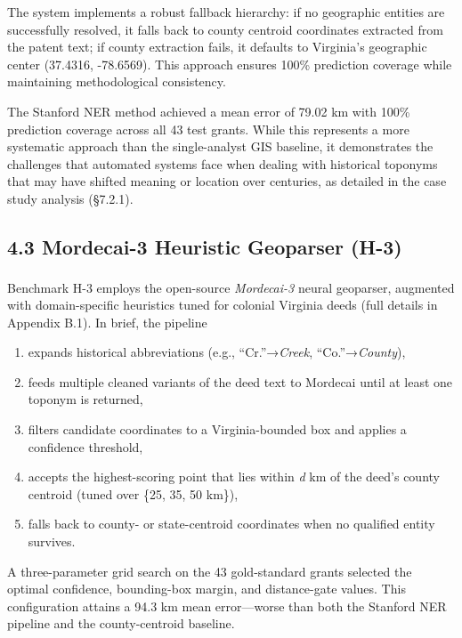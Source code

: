\documentclass[
  10pt]{article}
\providecommand{\tightlist}{%
  \setlength{\itemsep}{0pt}\setlength{\parskip}{0pt}}
\begin{document}
The system implements a robust fallback hierarchy: if no geographic
entities are successfully resolved, it falls back to county centroid
coordinates extracted from the patent text; if county extraction fails,
it defaults to Virginia's geographic center (37.4316, -78.6569). This
approach ensures 100\% prediction coverage while maintaining
methodological consistency.

The Stanford NER method achieved a mean error of 79.02 km with 100\%
prediction coverage across all 43 test grants. While this represents a
more systematic approach than the single-analyst GIS baseline, it
demonstrates the challenges that automated systems face when dealing
with historical toponyms that may have shifted meaning or location over
centuries, as detailed in the case study analysis (§7.2.1).

\subsection{4.3 Mordecai-3 Heuristic Geoparser
(H-3)}\label{mordecai-3-heuristic-geoparser-h-3}

Benchmark H-3 employs the open-source \emph{Mordecai-3} neural
geoparser\textsuperscript{},
augmented with domain-specific heuristics tuned for colonial Virginia
deeds (full details in Appendix B.1). In brief, the pipeline

\begin{enumerate}
\def\labelenumi{\arabic{enumi}.}
\tightlist
\item
  expands historical abbreviations (e.g., ``Cr.''→\emph{Creek},
  ``Co.''→\emph{County}),
\item
  feeds multiple cleaned variants of the deed text to Mordecai until at
  least one toponym is returned,
\item
  filters candidate coordinates to a Virginia-bounded box and applies a
  confidence threshold,
\item
  accepts the highest-scoring point that lies within \emph{d} km of the
  deed's county centroid (tuned over \{25, 35, 50 km\}),
\item
  falls back to county- or state-centroid coordinates when no qualified
  entity survives.
\end{enumerate}

A three-parameter grid search on the 43 gold-standard grants selected
the optimal confidence, bounding-box margin, and distance-gate values.
This configuration attains a 94.3 km mean error---worse than both the
Stanford NER pipeline and the county-centroid baseline.
\end{document}
